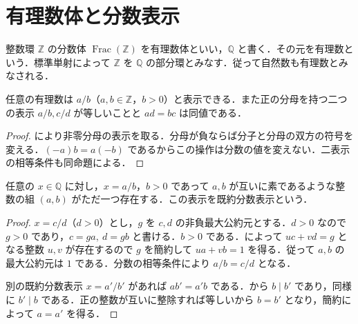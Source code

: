 \section{有理数体と分数表示}
\begin{defn}[有理数体]
整数環 $\mathbb Z$ の分数体 $\operatorname{Frac}(\mathbb Z)$ を有理数体といい，$\mathbb Q$ と書く．その元を有理数という．標準単射によって $\mathbb Z$ を $\mathbb Q$ の部分環とみなす．従って自然数も有理数とみなされる．
\end{defn}
\begin{prop}[正の分母による表示]
任意の有理数は $a/b$（$a,b\in\mathbb Z$，$b>0$）と表示できる．また正の分母を持つ二つの表示 $a/b,c/d$ が等しいことと $ad=bc$ は同値である．
\end{prop}
\begin{proof}
により非零分母の表示を取る．分母が負ならば分子と分母の双方の符号を変える．$(-a)b=a(-b)$ であるからこの操作は分数の値を変えない．二表示の相等条件も同命題による．
\end{proof}
\begin{prop}[有理数の既約分数表示]
任意の $x\in\mathbb Q$ に対し，$x=a/b$，$b>0$ であって $a,b$ が互いに素であるような整数の組 $(a,b)$ がただ一つ存在する．この表示を既約分数表示という．
\end{prop}
\begin{proof}
$x=c/d$（$d>0$）とし，$g$ を $c,d$ の非負最大公約元とする．$d>0$ なので $g>0$ であり，$c=ga,\ d=gb$ と書ける．$b>0$ である．によって $uc+vd=g$ となる整数 $u,v$ が存在するので $g$ を簡約して $ua+vb=1$ を得る．従って $a,b$ の最大公約元は $1$ である．分数の相等条件により $a/b=c/d$ となる．

別の既約分数表示 $x=a'/b'$ があれば $ab'=a'b$ である．から $b\mid b'$ であり，同様に $b'\mid b$ である．正の整数が互いに整除すれば等しいから $b=b'$ となり，簡約によって $a=a'$ を得る．
\end{proof}
